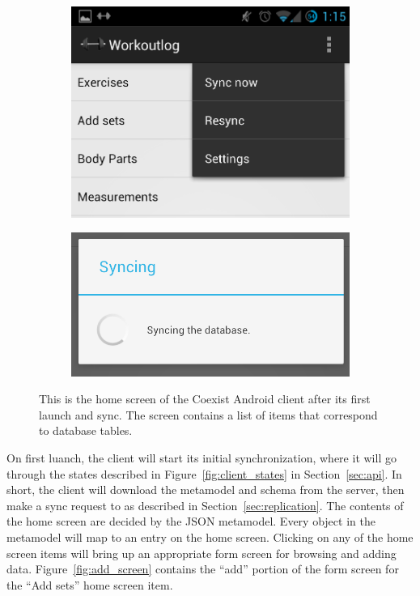 \begin{figure}[h!]
    \centering
    \begin{subfigure}[b]{0.25\textwidth}
        \includegraphics[width=.9\textwidth]{images/ss/menu.png}
        \label{fig:gull}
    \end{subfigure}%
    \begin{subfigure}[b]{0.25\textwidth}
        \includegraphics[width=.9\textwidth]{images/ss/syncing.png}
        \label{fig:tiger}
    \end{subfigure}
    \caption{This is the home screen of the Coexist Android client after its
    first launch and sync. The screen contains a list of items that correspond
  to database tables.}
    \label{fig:start_screen}
\end{figure}


On first luanch, the client will start its initial synchronization, where it will go
through the states described in Figure~\ref{fig:client_states} in
Section~\ref{sec:api}. In short, the client will download the metamodel and
schema from the server, then make a sync request to \sync as described in
Section~\ref{sec:replication}. The contents of the home screen are decided by
the JSON metamodel. Every  object in the metamodel will map to an
entry on the home screen. Clicking on any of the home screen items will bring up
an appropriate form screen for browsing and adding data.
Figure~\ref{fig:add_screen} contains the ``add'' portion of the form screen for
the ``Add sets'' home screen item. 



